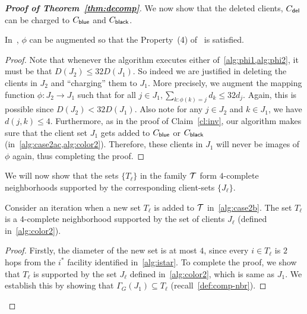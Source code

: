 \begin{proof}[{\bf Proof of Theorem~\ref{thm:decomp}}]
We now show that the deleted clients, $C_{\mathsf{del}}$ can be charged to $C_{\mathsf{blue}}$ and $C_{\mathsf{black}}$.
\begin{claim} \label{cl:phi-augment}
In~, $\phi$ can be augmented so that the Property~(4) of~ is satisfied.
\end{claim}
\begin{proof}
Note that whenever the algorithm executes either of~\cref{alg:phi1,alg:phi2}, it must be that $D(J_2) \leq 32 D(J_1)$. So indeed we are justified in deleting the clients in $J_2$ and ``charging'' them to $J_1$. More precisely, we augment the
mapping function $\phi:J_2 \to J_1$ such that for all $j\in J_1, \sum_{k:\phi(k) = j} d_k \leq 32d_j$. Again, this is possible since $D(J_2) < 32D(J_1)$. Also note for any $j\in J_2$ and $k\in J_1$,
we have $d(j,k) \leq 4$.
Furthermore, as in the proof of Claim~\ref{cl:inv}, our algorithm makes sure that the client set $J_1$ gets added to $C_{\mathsf{blue}}$ or $C_{\mathsf{black}}$ (in~\cref{alg:case2ac,alg:color2}).
Therefore, these clients in $J_1$ will never be images of $\phi$ again, thus completing the proof.
\end{proof}


We will now show that the sets $\{T_\ell\}$ in the family ${\cal T}$ form $4$-complete neighborhoods supported by the corresponding client-sets $\{J_\ell\}$.
\begin{lemma} \label{lem:local}
Consider an iteration when a new set $T_\ell$ is added to ${\cal T}$ in~\cref{alg:case2b}. The set $T_\ell$ is a $4$-complete neighborhood supported by the set of clients $J_\ell$ (defined in~\cref{alg:color2}).
\end{lemma}

\begin{proof}
Firstly, the diameter of the new set is at most $4$, since every $i \in T_\ell$ is $2$ hops from the $i^*$ facility identified in~\cref{alg:istar}. To complete the proof, we show that $T_\ell$ is supported by the set $J_\ell$ defined in~\cref{alg:color2}, which is same as $J_1$. %
We establish this by showing that $\Gamma_G(J_1) \subseteq T_\ell$ (recall~\cref{def:comp-nbr}).


\end{proof}
\end{proof}
